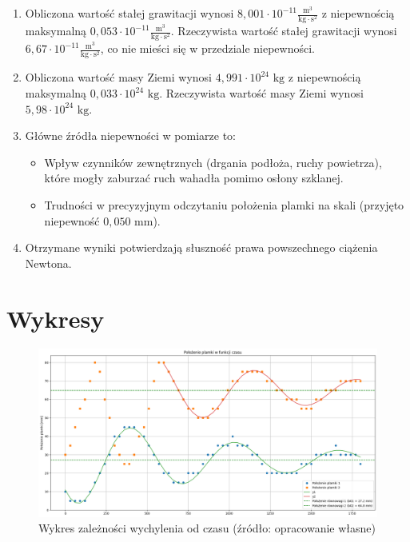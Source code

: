 \documentclass[a4paper,12pt]{article}
\begin{document}
\begin{enumerate}
    \item Obliczona wartość stałej grawitacji wynosi $8{,}001 \cdot 10^{-11} \frac{\text{m}^3}{\text{kg} \cdot \text{s}^2}$ z niepewnością maksymalną $0{,}053 \cdot 10^{-11} \frac{\text{m}^3}{\text{kg} \cdot \text{s}^2}$. Rzeczywista wartość stałej grawitacji wynosi $6{,}67 \cdot 10^{-11} \frac{\text{m}^3}{\text{kg} \cdot \text{s}^2}$, co nie mieści się w przedziale niepewności.

    \item Obliczona wartość masy Ziemi wynosi $4{,}991 \cdot 10^{24} \text{ kg}$ z niepewnością maksymalną $0{,}033 \cdot 10^{24} \text{ kg}$. Rzeczywista wartość masy Ziemi wynosi $5{,}98 \cdot 10^{24} \text{ kg}$.

    \item Główne źródła niepewności w pomiarze to:
          \begin{itemize}
              \item Wpływ czynników zewnętrznych (drgania podłoża, ruchy powietrza), które mogły zaburzać ruch wahadła pomimo osłony szklanej.
              \item Trudności w precyzyjnym odczytaniu położenia plamki na skali (przyjęto niepewność $0{,}050$ mm).
          \end{itemize}

    \item Otrzymane wyniki potwierdzają słuszność prawa powszechnego ciążenia Newtona.
\end{enumerate}
\newpage

\section{Wykresy}

\begin{figure}[H]
    \centering
    \includegraphics[width=0.9\textheight,angle=90]{wykres.png}
    \caption{Wykres zależności wychylenia od czasu (źródło: opracowanie własne)}
    \label{fig:wykres}
\end{figure}




\end{document}

